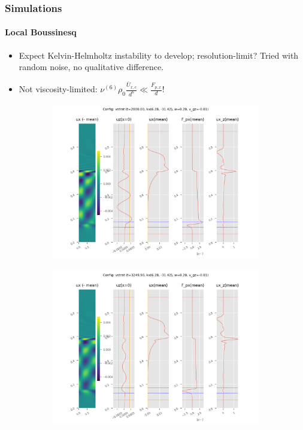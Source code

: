 \documentclass[dvipsnames, 10pt]{beamer}
\begin{document}
\begin{frame}
    \frametitle{Simulations}
    \framesubtitle{Local Boussinesq}
    \begin{itemize}
        \item Expect Kelvin-Helmholtz instability to develop; resolution-limit?
            Tried with random noise, no qualitative difference.

        \item Not viscosity-limited: $\nu^{(6)} \rho_0
            \frac{\bar{U}_{x, c}}{d^6} \ll \frac{F_{p, x}}{d}$!
    \end{itemize}

    \begin{figure}[t]
        \centering
        \hspace*{-19mm}%
        \begin{subfigure}{0.55\textwidth}
            \centering
            \includegraphics[width=\textwidth]{vstrat_2.png}
        \end{subfigure}
        \begin{subfigure}{0.55\textwidth}
            \centering
            \includegraphics[width=\textwidth]{vstrat_3.png}

\end{subfigure}
\end{figure}
\end{frame}
\end{document}
